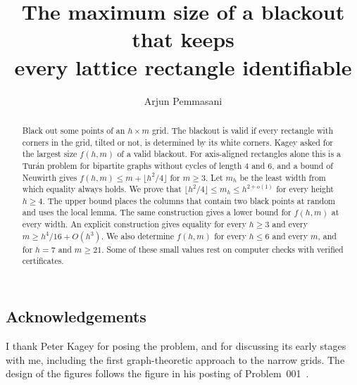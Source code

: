 \documentclass[12pt]{article}
\title{The maximum size of a blackout that keeps\\ every lattice rectangle identifiable}
\author{Arjun Pemmasani}
\begin{document}
\maketitle

\begin{abstract}
Black out some points of an $h\times m$ grid. The blackout is valid if every rectangle with
corners in the grid, tilted or not, is determined by its white corners. Kagey asked for the
largest size $f(h,m)$ of a valid blackout. For axis-aligned rectangles alone this is a
Tur\'an problem for bipartite graphs without cycles of length $4$ and $6$, and a bound of
Neuwirth gives $f(h,m)\le m+\lfloor h^2/4\rfloor$ for $m\ge3$. Let $m_h$ be the least width
from which equality always holds. We prove that
$\lfloor h^2/4\rfloor\le m_h\le h^{2+o(1)}$ for every height $h\ge4$. The upper bound places
the columns that contain two black points at random and uses the local lemma. The same
construction gives a lower bound for $f(h,m)$ at every width. An explicit construction
gives equality for every $h\ge3$ and every $m\ge h^4/16+O(h^3)$. We also determine
$f(h,m)$ for every $h\le6$ and every $m$, and for $h=7$ and $m\ge21$. Some of these small
values rest on computer checks with verified certificates.
\end{abstract}











\subsection*{Acknowledgements}

I thank Peter Kagey for posing the problem, and for discussing its early stages with me,
including the first graph-theoretic approach to the narrow grids. The design of the
figures follows the figure in his posting of Problem~001~\cite{kagey001}.

\SquashBibFurther


\end{document}
